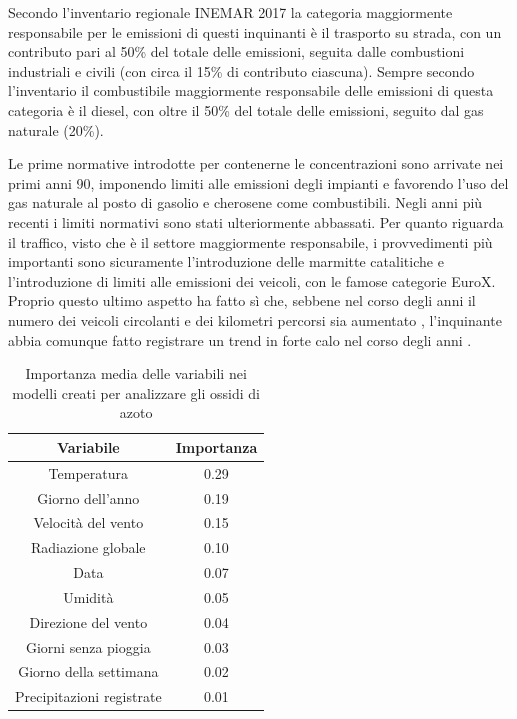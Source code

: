 Secondo l'inventario regionale INEMAR 2017 \cite{inemar2017} la categoria maggiormente responsabile per le emissioni di questi inquinanti è il trasporto su strada, con un contributo pari al 50\% del totale delle emissioni, seguita dalle combustioni industriali e civili (con circa il 15\% di contributo ciascuna). Sempre secondo l'inventario il combustibile maggiormente responsabile delle emissioni di questa categoria è il diesel, con oltre il 50\% del totale delle emissioni, seguito dal gas naturale (20\%).

Le prime normative introdotte per contenerne le concentrazioni sono arrivate nei primi anni 90, imponendo limiti alle emissioni degli impianti e favorendo l'uso del gas naturale al posto di gasolio e cherosene come combustibili. Negli anni più recenti i limiti normativi sono stati ulteriormente abbassati. Per quanto riguarda il traffico, visto che è il settore maggiormente responsabile, i provvedimenti più importanti sono sicuramente l'introduzione delle marmitte catalitiche e l'introduzione di limiti alle emissioni dei veicoli, con le famose categorie EuroX. Proprio questo ultimo aspetto ha fatto sì che, sebbene nel corso degli anni il numero dei veicoli circolanti e dei kilometri percorsi sia aumentato
, l'inquinante abbia comunque fatto registrare un trend in forte calo nel corso degli anni \cite{iir2020}.

\begin{table}[h!]
\centering
\begin{tabular}{ |c c| }
	\hline
	Variabile & Importanza \\
	\hline
	Temperatura & 0.29 \\
	Giorno dell'anno & 0.19 \\
	Velocità del vento & 0.15 \\
	Radiazione globale & 0.10 \\
	Data & 0.07 \\
	Umidità & 0.05 \\
	Direzione del vento & 0.04 \\
	Giorni senza pioggia & 0.03 \\
	Giorno della settimana & 0.02 \\
	Precipitazioni registrate & 0.01 \\
	\hline
\end{tabular}
\caption{Importanza media delle variabili nei modelli creati per analizzare gli ossidi di azoto}
\label{table:importanza_nox}
\end{table}

